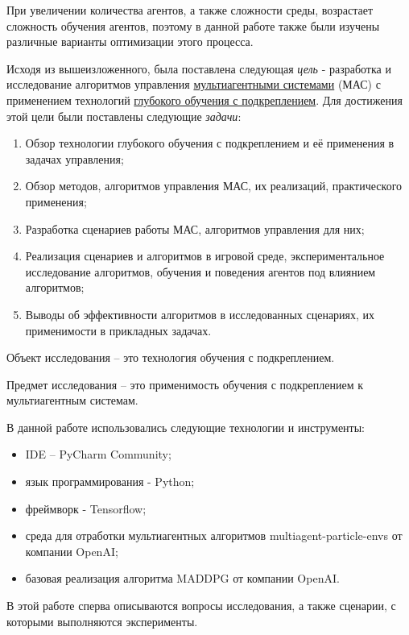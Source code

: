 При увеличении количества агентов, а также сложности среды, возрастает сложность обучения агентов, поэтому в данной работе также были изучены различные варианты оптимизации этого процесса.

Исходя из вышеизложенного, была поставлена следующая \textit{цель} - разработка и исследование алгоритмов управления \hyperref[acr:rl]{мультиагентными системами} (МАС) с применением технологий \hyperref[acr:drl]{глубокого обучения с подкреплением}. Для достижения этой цели были поставлены следующие \textit{задачи}:

\begin{enumerate}
	\item Обзор технологии глубокого обучения с подкреплением и её применения в задачах управления;
	\item Обзор методов, алгоритмов управления МАС, их реализаций, практического применения;
	\item Разработка сценариев работы МАС, алгоритмов управления для них;
	\item Реализация сценариев и алгоритмов в игровой среде, экспериментальное исследование алгоритмов, обучения и поведения агентов под влиянием алгоритмов;
	\item Выводы об эффективности алгоритмов в исследованных сценариях, их применимости в прикладных задачах. 
\end{enumerate}

Объект исследования -- это технология обучения с подкреплением.

Предмет исследования -- это применимость обучения с подкреплением к мультиагентным системам.

В данной работе использовались следующие технологии и инструменты:

\begin{itemize}
	\item IDE -- PyCharm Community;
	\item язык программирования - Python;
	\item фреймворк - Tensorflow;
	\item среда для отработки мультиагентных алгоритмов multiagent-particle-envs \cite{multiagent-particle-envs} от компании OpenAI;
	\item базовая реализация алгоритма MADDPG \cite{lowe2017multiagent} от компании OpenAI.
\end{itemize}

В этой работе сперва описываются вопросы исследования, а также сценарии, с которыми выполняются эксперименты.

